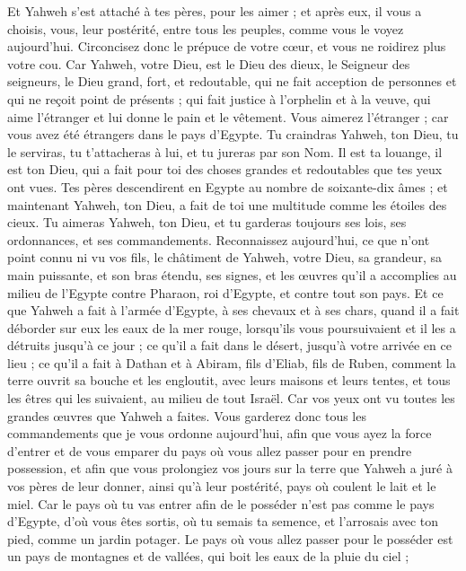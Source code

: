 \begin{multicols}{2}
Et Yahweh s’est attaché à tes pères, pour les aimer ; et après eux, il vous a choisis, vous, leur postérité, entre tous les peuples, comme vous le voyez aujourd'hui.
Circoncisez donc le prépuce de votre cœur, et vous ne roidirez plus votre cou.
Car Yahweh, votre Dieu, est le Dieu des dieux, le Seigneur des seigneurs\FTNT{}, le Dieu grand, fort, et redoutable, qui ne fait acception de personnes et qui ne reçoit point de présents ;
qui fait justice à l'orphelin et à la veuve, qui aime l'étranger et lui donne le pain et le vêtement.
Vous aimerez l'étranger ; car vous avez été étrangers dans le pays d'Egypte.
Tu craindras Yahweh, ton Dieu, tu le serviras, tu t'attacheras à lui, et tu jureras par son Nom.
Il est ta louange, il est ton Dieu, qui a fait pour toi des choses grandes et redoutables que tes yeux ont vues.
Tes pères descendirent en Egypte au nombre de soixante-dix âmes ; et maintenant Yahweh, ton Dieu, a fait de toi une multitude comme les étoiles des cieux.
\VerseOne{}Tu aimeras Yahweh, ton Dieu, et tu garderas toujours ses lois, ses ordonnances, et ses commandements.
Reconnaissez aujourd'hui, ce que n’ont point connu ni vu vos fils, le châtiment de Yahweh, votre Dieu, sa grandeur, sa main puissante, et son bras étendu,
ses signes, et les œuvres qu'il a accomplies au milieu de l'Egypte contre Pharaon, roi d'Egypte, et contre tout son pays.
Et ce que Yahweh a fait à l'armée d'Egypte, à ses chevaux et à ses chars, quand il a fait déborder sur eux les eaux de la mer rouge, lorsqu'ils vous poursuivaient et il les a détruits jusqu'à ce jour ;
ce qu'il a fait dans le désert, jusqu'à votre arrivée en ce lieu ;
ce qu'il a fait à Dathan et à Abiram, fils d'Eliab, fils de Ruben, comment la terre ouvrit sa bouche et les engloutit, avec leurs maisons et leurs tentes, et tous les êtres qui les suivaient, au milieu de tout Israël.
Car vos yeux ont vu toutes les grandes œuvres que Yahweh a faites.
Vous garderez donc tous les commandements que je vous ordonne aujourd'hui, afin que vous ayez la force d’entrer et de vous emparer du pays où vous allez passer pour en prendre possession,
et afin que vous prolongiez vos jours sur la terre que Yahweh a juré à vos pères de leur donner, ainsi qu’à leur postérité, pays où coulent le lait et le miel.
Car le pays où tu vas entrer afin de le posséder n'est pas comme le pays d'Egypte, d’où vous êtes sortis, où tu semais ta semence, et l'arrosais avec ton pied, comme un jardin potager.
Le pays où vous allez passer pour le posséder est un pays de montagnes et de vallées, qui boit les eaux de la pluie du ciel ;

\end{multicols}
